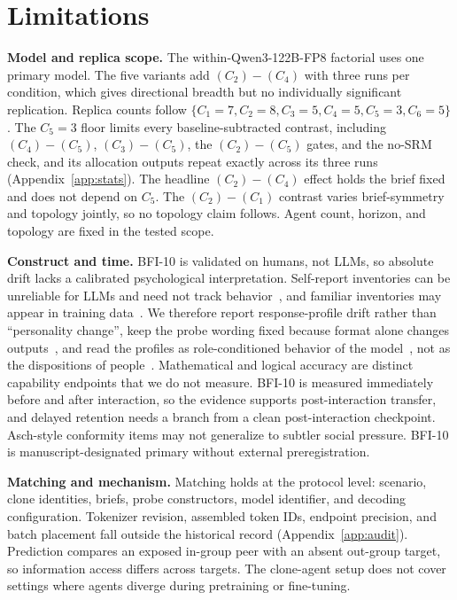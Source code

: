 \section{Limitations}\label{sec:exp-limits}

\textbf{Model and replica scope.} The within-Qwen3-122B-FP8 factorial uses one primary model. The five variants add $(C_2){-}(C_4)$ with three runs per condition, which gives directional breadth but no individually significant replication. Replica counts follow $\{C_1{=}7, C_2{=}8, C_3{=}5, C_4{=}5, C_5{=}3, C_6{=}5\}$. The $C_5{=}3$ floor limits every baseline-subtracted contrast, including $(C_4){-}(C_5)$, $(C_3){-}(C_5)$, the $(C_2){-}(C_5)$ gates, and the no-SRM check, and its allocation outputs repeat exactly across its three runs (Appendix~\ref{app:stats}). The headline $(C_2){-}(C_4)$ effect holds the brief fixed and does not depend on $C_5$. The $(C_2){-}(C_1)$ contrast varies brief-symmetry and topology jointly, so no topology claim follows. Agent count, horizon, and topology are fixed in the tested scope.

\textbf{Construct and time.} BFI-10 is validated on humans, not LLMs, so absolute drift lacks a calibrated psychological interpretation. Self-report inventories can be unreliable for LLMs and need not track behavior~\citep{Shu2024_PsychReliability,Gupta2024_SelfAssessment,Han2025_PersonalityIllusion}, and familiar inventories may appear in training data~\citep{Han2026_Contamination}. We therefore report response-profile drift rather than ``personality change'', keep the probe wording fixed because format alone changes outputs~\citep{Sclar2024_PromptFormat}, and read the profiles as role-conditioned behavior of the model~\citep{Shanahan2023}, not as the dispositions of people~\citep{Dillion2023}. Mathematical and logical accuracy are distinct capability endpoints that we do not measure. BFI-10 is measured immediately before and after interaction, so the evidence supports post-interaction transfer, and delayed retention needs a branch from a clean post-interaction checkpoint. Asch-style conformity items may not generalize to subtler social pressure. BFI-10 is manuscript-designated primary without external preregistration.

\textbf{Matching and mechanism.} Matching holds at the protocol level: scenario, clone identities, briefs, probe constructors, model identifier, and decoding configuration. Tokenizer revision, assembled token IDs, endpoint precision, and batch placement fall outside the historical record (Appendix~\ref{app:audit}). Prediction compares an exposed in-group peer with an absent out-group target, so information access differs across targets. The clone-agent setup does not cover settings where agents diverge during pretraining or fine-tuning.
